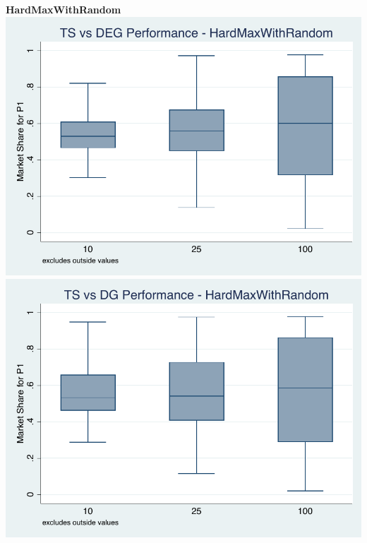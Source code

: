 \documentclass[11pt,letterpaper]{article}
\begin{document}
\pagebreak
\textbf{HardMaxWithRandom} \\
\includegraphics[scale=0.75]{hmr_ts_deg} \\
\includegraphics[scale=0.75]{hmr_ts_dg} \\
\end{document}
